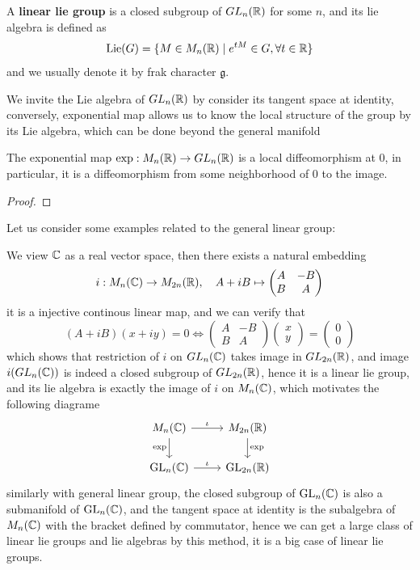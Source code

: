 \begin{colordefinition}
    A \textbf{linear lie group} is a closed subgroup of \(GL_n(\mathbb{R})\) for some \(n\), and its lie algebra is defined as 
    \[\mathrm{Lie}(G) = \{M \in M_n(\mathbb{R}) \mid e^{tM} \in G, \forall t \in \mathbb{R}\}\]
    and we usually denote it by frak character \(\mathfrak{g}\).
\end{colordefinition}

We invite the Lie algebra of \(GL_n(\mathbb{R})\) by consider its tangent space at identity, conversely, exponential map allows us to know the local structure of the group by its Lie algebra, which can be done beyond the general manifold
\begin{theorem}
    The exponential map \(\exp: M_n(\mathbb{R}) \to GL_n(\mathbb{R})\) is a local diffeomorphism at \(0\), in particular, it is a diffeomorphism from some neighborhood of \(0\) to the image.
\end{theorem}

\begin{proof}
    
\end{proof}

Let us consider some examples related to the general linear group:

\begin{example}
    We view \(\mathbb{C}\) as a real vector space, then there exists a natural embedding
    \[i:M_n(\mathbb{C}) \to M_{2n}(\mathbb{R}), \quad A+iB \mapsto \begin{pmatrix} A & -B \\ B & A \end{pmatrix}\]
    it is a injective continous linear map, and we can verify that 
    \[(A+iB)(x+iy) = 0 \iff \begin{pmatrix}
        A & -B \\
        B & A 
    \end{pmatrix} \begin{pmatrix} x \\ y \end{pmatrix} = \begin{pmatrix} 0 \\ 0 \end{pmatrix}\]
    which shows that restriction of \(i\) on \(GL_n(\mathbb{C})\) takes image in \(GL_{2n}(\mathbb{R})\), and image \(i(GL_n(\mathbb{C}))\) is indeed a closed subgroup of \(GL_{2n}(\mathbb{R})\), hence it is a linear lie group, and its lie algebra is exactly the image of \(i\) on \(M_n(\mathbb{C})\), which motivates the following diagrame
    \[
\begin{tikzcd}
M_n(\mathbb{C}) \arrow[r, "\iota"] \arrow[d, "\exp"'] 
& M_{2n}(\mathbb{R}) \arrow[d, "\exp"] \\
\mathrm{GL}_n(\mathbb{C}) \arrow[r, "\iota"] 
& \mathrm{GL}_{2n}(\mathbb{R})
\end{tikzcd}
\]
similarly with general linear group, the closed subgroup of \(\operatorname{GL}_n(\mathbb{C})\) is also a submanifold of \(\operatorname{GL}_n(\mathbb{C})\), and the tangent space at identity is the subalgebra of \(M_n(\mathbb{C})\) with the bracket defined by commutator, hence we can get a large class of linear lie groups and lie algebras by this method, it is a big case of linear lie groups.
\end{example}

